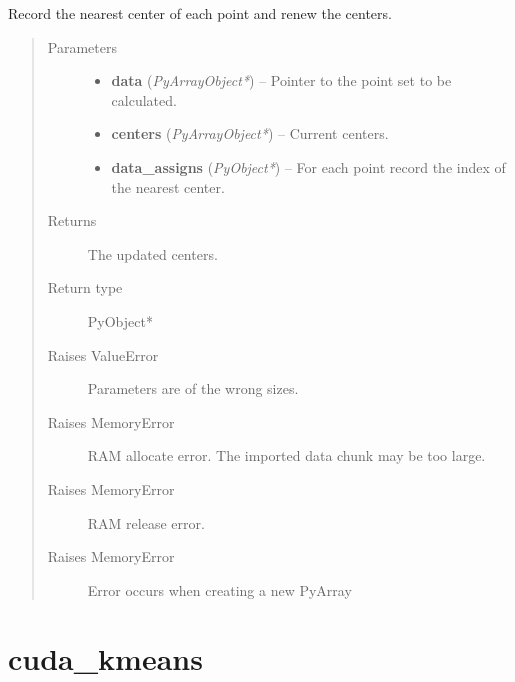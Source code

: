 \documentclass[letterpaper,10pt,english]{sphinxmanual}
\begin{document}

\begin{fulllineitems}
\label{kmeans:c.kmeans_chunk_center}
Record the nearest center of each point and renew the centers.
\begin{quote}\begin{description}
\item[{Parameters}] \leavevmode\begin{itemize}
\item {} 
\textbf{data} (\emph{PyArrayObject*}) -- Pointer to the point set to be calculated.

\item {} 
\textbf{centers} (\emph{PyArrayObject*}) -- Current centers.

\item {} 
\textbf{data\_assigns} (\emph{PyObject*}) -- For each point record the index of the nearest center.

\end{itemize}

\item[{Returns}] \leavevmode
The updated centers.

\item[{Return type}] \leavevmode
PyObject*

\item[{Raises ValueError}] \leavevmode
Parameters are of the wrong sizes.

\item[{Raises MemoryError}] \leavevmode
RAM allocate error. The imported data chunk may be too large.

\item[{Raises MemoryError}] \leavevmode
RAM release error.

\item[{Raises MemoryError}] \leavevmode
Error occurs when creating a new PyArray

\end{description}\end{quote}

\end{fulllineitems}



\section{cuda\_kmeans}
\label{kmeans:cuda-kmeans}
\end{document}
